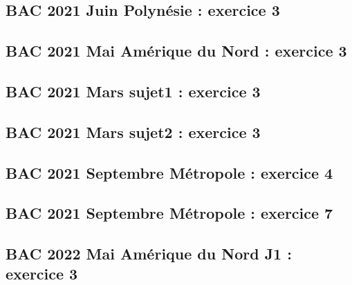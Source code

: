 \documentclass[lang=fr,edition=teacher,layout=sheet]{mxbook}
\begin{document}
\subsection*{BAC 2021 Juin Polynésie : exercice 3}
\begingroup\endgroup
\par\bigskip
{}\subsection*{BAC 2021 Mai Amérique du Nord : exercice 3}
\begingroup\endgroup
\par\bigskip
{}\subsection*{BAC 2021 Mars sujet1 : exercice 3}
\begingroup\endgroup
\par\bigskip
{}\subsection*{BAC 2021 Mars sujet2 : exercice 3}
\begingroup\endgroup
\par\bigskip
{}\subsection*{BAC 2021 Septembre Métropole : exercice 4}
\begingroup\endgroup
\par\bigskip
{}\subsection*{BAC 2021 Septembre Métropole : exercice 7}
\begingroup\endgroup
\par\bigskip
{}\subsection*{BAC 2022 Mai Amérique du Nord J1 : exercice 3}
\begingroup\endgroup
\end{document}
